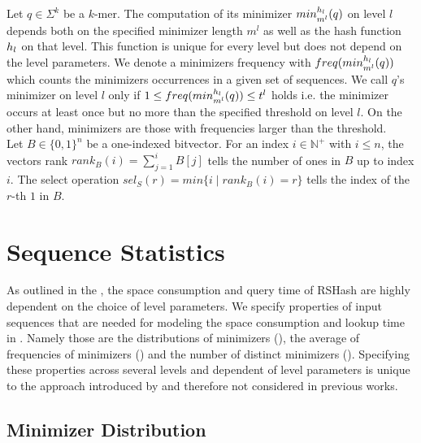 \documentclass[a4paper,titlepage,onecolumn,oneside,12pt,nenglish,titlepage=firstiscover]{scrbook}
\theoremstyle{plain} %
\theoremstyle{definition} %
\theoremstyle{remark} %
\theoremstyle{plain}
\newcommand{\NN}{\mathbb{N}} %
\newcommand{\minimizerLength}{m}
\newcommand{\threshold}{t}
\newcommand{\level}{l}
\newcommand{\kmer}{q}
\newcommand{\rank}{rank}
\newcommand{\select}{sel}
\begin{document}
Let $\kmer \in \Sigma^{k}$ be a $k$-mer. The computation of its minimizer $\minimizerOf{\kmer}{\level}$ on level $l$ depends both on the specified minimizer length $\minimizerLength^\level$ as well as the hash function $\hashfunction{\level}$ on that level. This function is unique for every level but does not depend on the level parameters. We denote a minimizers frequency with $\frequencyOf{\minimizerOf{\kmer}{\level}}$ which counts the minimizers occurrences in a given set of sequences. We call $\kmer$'s minimizer \infrequent on level $\level$ only if $1 \leq \frequencyOf{\minimizerOf{\kmer}{\level}} \leq \threshold^\level$ holds i.e. the minimizer occurs at least once but no more than the specified threshold on level $\level$. On the other hand, \frequent minimizers are those with frequencies larger than the threshold.\\
Let $B \in \{0,1\}^n$ be a one-indexed bitvector. For an index $i \in \NN^+$ with $i \leq n$, the vectors rank $\rank_B(i) = \sum_{j=1}^{i} B[j]$ tells the number of ones in $B$ up to index $i$. The select operation $\select_S(r) = min\{i \mid \rank_B(i) = r\}$ tells the index of the $r$-th $1$ in $B$.

\chapter{Sequence Statistics}\label{chap:sequenceStatistics}
As outlined in the , the space consumption and query time of RSHash are highly dependent on the choice of level parameters. We specify properties of input sequences that are needed for modeling the space consumption and lookup time in . Namely those are the distributions of minimizers (), the average of frequencies of minimizers () and the number of distinct \infrequent minimizers (). Specifying these properties across several levels and dependent of level parameters is unique to the approach introduced by \citet{schulte-mattler_rshash_2026} and therefore not considered in previous works.

\section{Minimizer Distribution} \label{sec:minimizerDistribution_severalLevels}
\newcommand{\distinctMinimizers}[1]{\mathcal{M}_{\levelParameters{#1-1}, \minimizerLength^{#1}}}
\newcommand{\distinctKmers}[1]{\mathcal{K}_{\levelParameters{#1-1}}}
\end{document}
